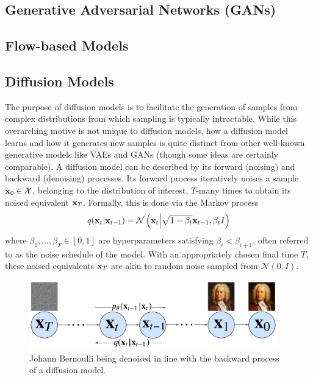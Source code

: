 \documentclass[11pt]{article}
\begin{document}
\subsection{\TODO{: }Generative Adversarial Networks (GANs)}

\subsection{\TODO{: }Flow-based Models}

\subsection{Diffusion Models}
The purpose of diffusion models is to facilitate the generation of samples from complex distributions from which sampling is typically intractable. While this overarching motive is not unique to diffusion models, how a diffusion model learns and how it generates new samples is quite distinct from other well-known generative models like VAEs and GANs (though some ideas are certainly comparable). A diffusion model can be described by its forward (noising) and backward (denoising) processes. Its forward process iteratively noises a sample $\mathbf{x}_0\in\mathcal{X}$, belonging to the distribution of interest, $T$-many times to obtain its noised equivalent $\mathbf{x}_T$. Formally, this is done via the Markov process
$$
q(\mathbf{x}_t|\mathbf{x}_{t-1})
=
\mathcal{N}\left(\mathbf{x}_t\Big|\sqrt{1-\beta_t}\mathbf{x}_{t-1},\beta_tI\right)
$$
where $\beta_1,\dots,\beta_T\in[0,1]$ are hyperparameters satisfying $\beta_i<\beta_{i+1}$, often referred to as the noise schedule of the model. With an appropriately chosen final time $T$, these noised equivalents $\mathbf{x}_T$ are akin to random noise sampled from $\mathcal{N}(0,I)$.

\begin{figure}[t]
    \centering
    \includegraphics[height=3cm]{./figures/generative_models/diffusion_process.pdf}
    \caption{Johann Bernoulli being denoised in line with the backward process of a diffusion model. }
    \label{fig:diffusion_process}
\end{figure}
\end{document}
